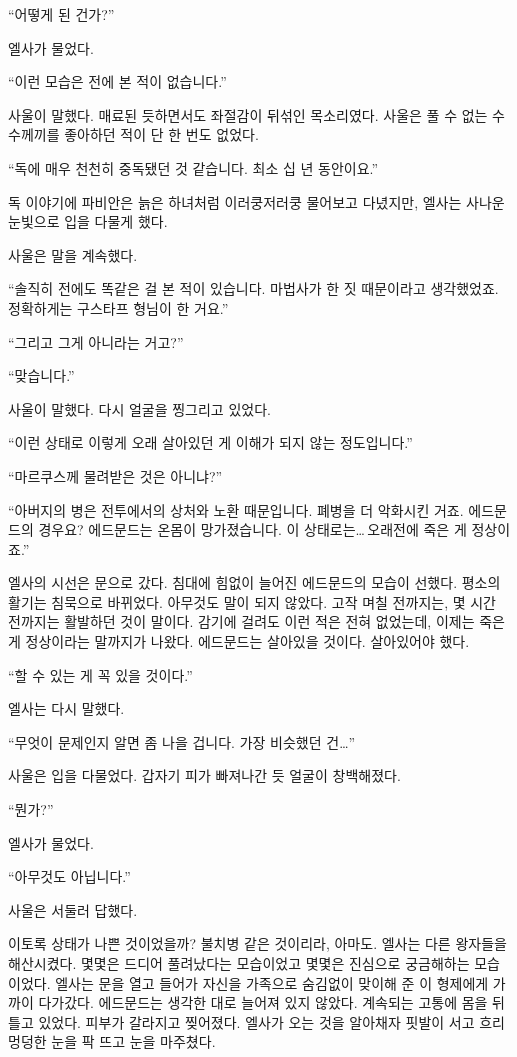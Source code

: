 ``어떻게 된 건가?''

엘사가 물었다.

``이런 모습은 전에 본 적이 없습니다.''

사울이 말했다. 매료된 듯하면서도 좌절감이 뒤섞인 목소리였다. 사울은 풀 수 없는 수수께끼를 좋아하던 적이 단 한 번도 없었다.

``독에 매우 천천히 중독됐던 것 같습니다. 최소 십 년 동안이요.''

독 이야기에 파비안은 늙은 하녀처럼 이러쿵저러쿵 물어보고 다녔지만, 엘사는 사나운 눈빛으로 입을 다물게 했다.

사울은 말을 계속했다.

``솔직히 전에도 똑같은 걸 본 적이 있습니다. 마법사가 한 짓 때문이라고 생각했었죠. 정확하게는 구스타프 형님이 한 거요.''

``그리고 그게 아니라는 거고?''

``맞습니다.''

사울이 말했다. 다시 얼굴을 찡그리고 있었다.

``이런 상태로 이렇게 오래 살아있던 게 이해가 되지 않는 정도입니다.''

``마르쿠스께 물려받은 것은 아니냐?''

``아버지의 병은 전투에서의 상처와 노환 때문입니다. 폐병을 더 악화시킨 거죠. 에드문드의 경우요? 에드문드는 온몸이 망가졌습니다. 이 상태로는\ldots\,오래전에 죽은 게 정상이죠.''

엘사의 시선은 문으로 갔다. 침대에 힘없이 늘어진 에드문드의 모습이 선했다. 평소의 활기는 침묵으로 바뀌었다. 아무것도 말이 되지 않았다. 고작 며칠 전까지는, 몇 시간 전까지는 활발하던 것이 말이다. 감기에 걸려도 이런 적은 전혀 없었는데, 이제는 죽은 게 정상이라는 말까지가 나왔다. 에드문드는 살아있을 것이다. 살아있어야 했다.

``할 수 있는 게 꼭 있을 것이다.''

엘사는 다시 말했다.

``무엇이 문제인지 알면 좀 나을 겁니다. 가장 비슷했던 건\ldots''

사울은 입을 다물었다. 갑자기 피가 빠져나간 듯 얼굴이 창백해졌다.

``뭔가?''

엘사가 물었다.

``아무것도 아닙니다.''

사울은 서둘러 답했다.

이토록 상태가 나쁜 것이었을까? 불치병 같은 것이리라, 아마도. 엘사는 다른 왕자들을 해산시켰다. 몇몇은 드디어 풀려났다는 모습이었고 몇몇은 진심으로 궁금해하는 모습이었다. 엘사는 문을 열고 들어가 자신을 가족으로 숨김없이 맞이해 준 이 형제에게 가까이 다가갔다. 에드문드는 생각한 대로 늘어져 있지 않았다. 계속되는 고통에 몸을 뒤틀고 있었다. 피부가 갈라지고 찢어졌다. 엘사가 오는 것을 알아채자 핏발이 서고 흐리멍덩한 눈을 팍 뜨고 눈을 마주쳤다.

